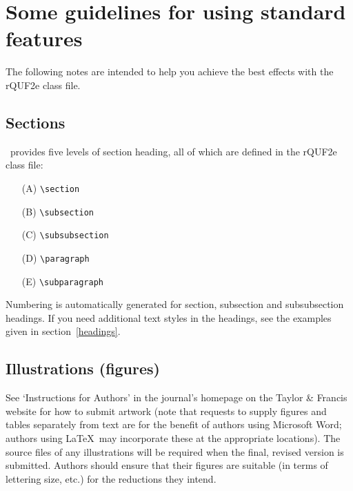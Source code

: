 \documentclass{rQUF2e}
\theoremstyle{plain}
\theoremstyle{definition}
\theoremstyle{remark}
\begin{document}
\section{Some guidelines for using standard features}

The following notes are intended to help you achieve the best effects with the rQUF2e class file.


\subsection{Sections}

\LaTeXe\ provides five levels of section heading, all of which are defined in the rQUF2e class file:
\begin{enumerate}
  \item[(A)] \verb"\section"
  \item[(B)] \verb"\subsection"
  \item[(C)] \verb"\subsubsection"
  \item[(D)] \verb"\paragraph"
  \item[(E)] \verb"\subparagraph"
\end{enumerate}
Numbering is automatically generated for section, subsection and subsubsection headings.
If you need additional text styles in the headings, see the examples given in section~\ref{headings}.


\subsection{Illustrations (figures)}

See `Instructions for Authors' in the journal's homepage on the Taylor \& Francis website for how to submit artwork (note that requests to supply figures and tables separately from text are for the benefit of authors using Microsoft Word; authors using \LaTeX\ may incorporate these at the appropriate locations). The source files of any illustrations will be required when the final, revised version is submitted. Authors should ensure that their figures are suitable (in terms of lettering size, etc.) for the reductions they intend.
\end{document}

